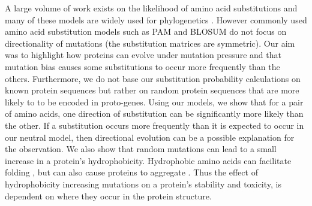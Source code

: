 \documentclass[12pt,a4paper]{article}
\begin{document}
A large volume of work exists on the likelihood of amino acid substitutions and many of these models are widely used for phylogenetics \citep{aasubOhta,PAM,blosum,submat92,submat92j,submat01,submat05,submat07,submat08}. However commonly used amino acid substitution models such as PAM and BLOSUM \citep{PAM,blosum} do not focus on directionality of mutations (the substitution matrices are symmetric). Our aim was to highlight how proteins can evolve under mutation pressure and that mutation bias causes some substitutions to occur more frequently than the others. Furthermore, we do not base our substitution probability calculations on known protein sequences but rather on random protein sequences that are more likely to to be encoded in proto-genes. Using our models, we show that for a pair of amino acids, one direction of substitution can be significantly more likely than the other. If a substitution occurs more frequently than it is expected to occur in our neutral model, then directional evolution can be a possible explanation for the observation. We also show that random mutations can lead to a small increase in a protein's hydrophobicity. Hydrophobic amino acids can facilitate folding \citep{Dill1985}, but can also cause proteins to aggregate \cite{hydrophobicRatchet}. Thus the effect of hydrophobicity increasing mutations on a protein's stability and toxicity, is dependent on where they occur in the protein structure.
\end{document}
